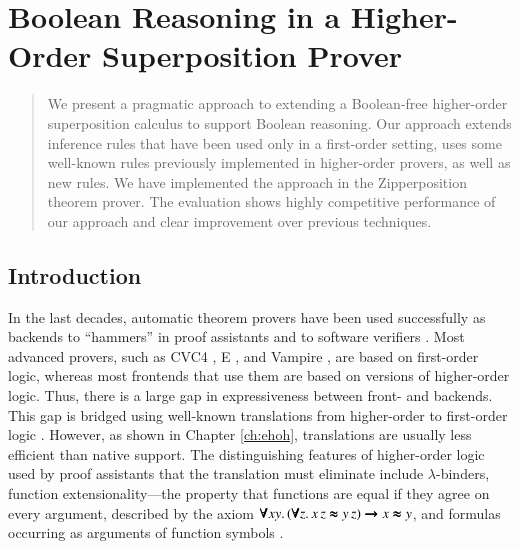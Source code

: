 \chapter{Boolean Reasoning in a Higher-Order Superposition Prover}
\label{ch:bools}




\begin{abstract}
    We present a pragmatic approach to extending a Boolean-free higher-order
    superposition calculus to support Boolean reasoning. Our approach extends
    inference rules that have been used only in a first-order setting, uses some
    well-known rules previously implemented in higher-order provers, as well as new rules.
    We have implemented the approach in the Zipperposition
    theorem prover. The evaluation shows highly competitive performance of our approach
    and clear improvement over previous techniques.
\end{abstract}

\newpage

\section{Introduction} 
\label{sect:bool:introduction}

In the last decades, automatic theorem provers have been used
successfully as backends to ``hammers'' in proof assistants
\cite{ku-15-holyhammer, pb-12-sh} and to software
verifiers \cite{fp-13-why3}. Most advanced provers, such as CVC4
\cite{cbetal-11-cvc4}, E \cite{scv-19-e23}, and Vampire
\cite{lkav-13-vampire}, are based on first-order logic, whereas
most frontends that use them are based on versions of higher-order logic. Thus,
there is a large gap in expressiveness between front- and backends.
%
This gap is bridged using well-known translations from higher-order to
first-order logic \cite{ar-70-hol,
mp-08-trans}. However, as shown in Chapter \ref{ch:ehoh}, translations are usually less efficient than native support. The
distinguishing features of higher-order logic used by proof assistants that the
translation must eliminate include
$\lambda$-binders, function extensionality---the property that functions are
equal if they agree on every argument, described by the axiom $\pmb\forall xy. \allowbreak\, (\pmb\forall z. \, x \, z \pmb\approx y \,z)
\pmb\rightarrow x \pmb\approx y$, and formulas occurring as arguments of function symbols \cite{mp-08-trans}.

